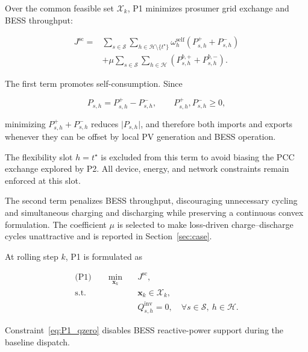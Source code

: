 \documentclass[journal]{IEEEtran}
\begin{document}
Over the common feasible set \(\mathcal{X}_{k}\), P1 minimizes prosumer grid exchange and BESS throughput:

\begin{equation}
\label{eq:Jsc}
\begin{aligned}
J^{\mathrm{sc}}
={}&
\sum_{s\in\mathcal{S}}
\sum_{h\in\mathcal{H}\setminus\{t^\star\}}
\omega^{\mathrm{self}}_{h}
\left(
P^{+}_{s,h}+P^{-}_{s,h}
\right)
\\
&+
\mu
\sum_{s\in\mathcal{S}}
\sum_{h\in\mathcal{H}}
\left(
P^{b,+}_{s,h}+P^{b,-}_{s,h}
\right).
\end{aligned}
\end{equation}

The first term promotes self-consumption. Since

\begin{equation}
\label{eq:exchange_split_identity}
P_{s,h}=P^{+}_{s,h}-P^{-}_{s,h},
\qquad
P^{+}_{s,h},P^{-}_{s,h}\geq0,
\end{equation}

minimizing \(P^{+}_{s,h}+P^{-}_{s,h}\) reduces \(\lvert P_{s,h}\rvert\), and therefore both imports and exports whenever they can be offset by local PV generation and BESS operation.

The flexibility slot \(h=t^\star\) is excluded from this term to avoid biasing the PCC exchange explored by P2. All device, energy, and network constraints remain enforced at this slot.

The second term penalizes BESS throughput, discouraging unnecessary cycling and simultaneous charging and discharging while preserving a continuous convex formulation. The coefficient \(\mu\) is selected to make loss-driven charge--discharge cycles unattractive and is reported in Section~\ref{sec:case}.

At rolling step \(k\), P1 is formulated as

\begin{subequations}
\label{eq:P1}
\begin{align}
\text{(P1)}\qquad
\min_{\bm{x}_{k}}\quad
& J^{\mathrm{sc}},
\label{eq:P1_obj}
\\
\text{s.t.}\quad
& \bm{x}_{k}\in\mathcal{X}_{k},
\label{eq:P1_common}
\\
& Q^{\mathrm{inv}}_{s,h}=0,
\quad
\forall s\in\mathcal{S},\
h\in\mathcal{H}.
\label{eq:P1_qzero}
\end{align}
\end{subequations}

Constraint~\eqref{eq:P1_qzero} disables BESS reactive-power support during the baseline dispatch.
\end{document}
